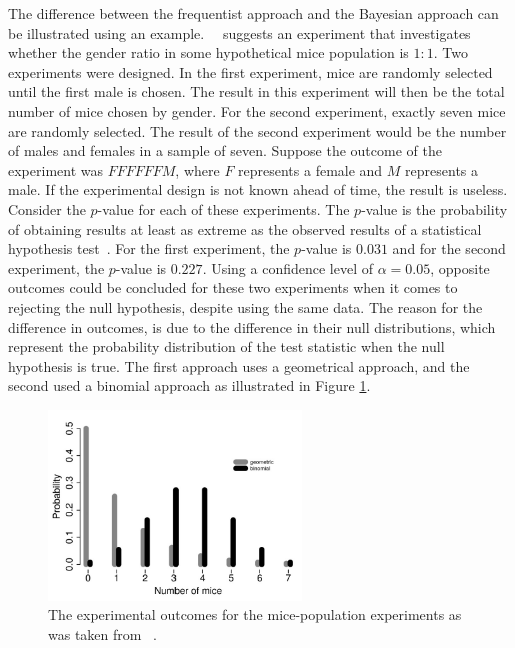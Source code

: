 The difference between the frequentist approach and the Bayesian approach can be illustrated using an example.~\citeauthor{ref:hackenberger:2019}~\cite{ref:hackenberger:2019} suggests an experiment that investigates whether the gender ratio in some hypothetical mice population is $1:1$. Two experiments were designed. In the first experiment, mice are randomly selected until the first male is chosen. The result in this experiment will then be the total number of mice chosen by gender. For the second experiment, exactly seven mice are randomly selected. The result of the second experiment would be the number of males and females in a sample of seven. Suppose the outcome of the experiment was $FFFFFFM$, where $F$ represents a female and $M$ represents a male. If the experimental design is not known ahead of time, the result is useless. Consider the $p$-value for each of these experiments. The $p$-value is the probability of obtaining results at least as extreme as the observed results of a statistical hypothesis test~\cite{ref:thisted:1998}. For the first experiment, the $p$-value is $0.031$ and for the second experiment, the $p$-value is $0.227$. Using a confidence level of $\alpha = 0.05$, opposite outcomes could be concluded for these two experiments when it comes to rejecting the null hypothesis, despite using the same data. The reason for the difference in outcomes, is due to the difference in their null distributions, which represent the probability distribution of the test statistic when the null hypothesis is true. The first approach uses a geometrical approach, and the second used a binomial approach as illustrated in Figure \ref{fig:probability:bayesian_statistics:mouse_experiment_outcome}.

\begin{figure}[htb]
	\centering
	\includegraphics[width=0.6\textwidth]{images/mouse_experiment_outcome.pdf}
	\caption{The experimental outcomes for the mice-population experiments as was taken from~\cite{ref:hackenberger:2019} .}
	\label{fig:probability:bayesian_statistics:mouse_experiment_outcome}
\end{figure}

